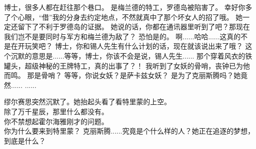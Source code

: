 \documentclass[openany]{book}
\begin{document}
\begin{dialogue}
     博士，很多人都在赶往那个巷口。
     是梅兰德的特工，罗德岛被陷害了。
     幸好你多了个心眼，“借”我的分身去约定地点，不然就真中了那个坏女人的招了哦。
     她一定还留下了不利于罗德岛的证据。
     她说的话，你都在通讯器里听到了吧？那现在我们岂不是要同时与军方和梅兰德为敌了？
     恐怕是的。
     啊......哈哈......这真的不是在开玩笑吧？
     博士，你和锡人先生有什么计划的话，现在就该说出来了哦？
     这个沉默的意思是......等等，博士，你该不会是说，锡人先生......
     那个穿着风衣的铁罐头，超级神秘的王牌特工，真的出事了？！
     我听到了女妖的骨哨，丧钟已为他而鸣。
     那是骨哨？
     等等，你说女妖？是萨卡兹女妖？
     是为了克丽斯腾吗？她竟然......
     ......\par
    缪尔赛思突然沉默了。她抬起头看了看特里蒙的上空。\\
    除了万千星辰，那里什么都没有。\\
    你不禁想起霍尔海雅刚才的问题。\\
    你为什么要来到特里蒙？
     克丽斯腾......究竟是个什么样的人？她正在追逐的梦想，到底是什么？
\end{dialogue}
\end{document}
